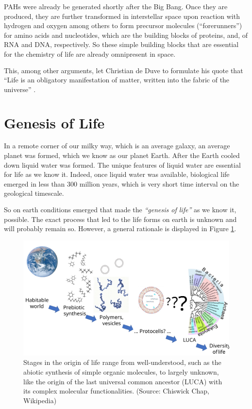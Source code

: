 \documentclass[
  11pt,
]{book}
\begin{document}
PAHs were already be generated shortly after the Big Bang. Once they are produced, they are further transformed in interstellar space upon reaction with hydrogen and oxygen among others to form precursor molecules (``forerunners'') for amino acids and nucleotides, which are the building blocks of proteins, and, of RNA and DNA, respectively. So these simple building blocks that are essential for the chemistry of life are already omnipresent in space.

This, among other arguments, let Christian de Duve to formulate his quote that ``Life is an obligatory manifestation of matter, written into the fabric of the universe'' \citep{deDuve2002}.

\hypertarget{genesis-of-life}{%
\section{Genesis of Life}\label{genesis-of-life}}

In a remote corner of our milky way, which is an average galaxy, an average planet was formed, which we know as our planet Earth.
After the Earth cooled down liquid water was formed. The unique features of liquid water are essential for life as we know it.
Indeed, once liquid water was available, biological life emerged in less than 300 million years, which is very short time interval on the geological timescale.

So on earth conditions emerged that made the \emph{``genesis of life''} as we know it, possible. The exact process that led to the life forms on earth is unknown and will probably remain so.
However, a general rationale is displayed in Figure \ref{fig:originOfLife}.

\begin{figure}

{\centering \includegraphics[width=1\linewidth]{./figs/origin_of_life_stages} 

}

\caption{Stages in the origin of life range from well-understood, such as the abiotic synthesis of simple organic molecules, to largely unknown, like the origin of the last universal common ancestor (LUCA) with its complex molecular functionalities. (Source: Chiswick Chap, Wikipedia)}\label{fig:originOfLife}
\end{figure}
\end{document}

